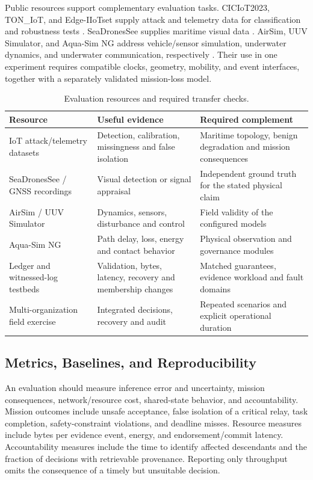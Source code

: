 Public resources support complementary evaluation tasks. CICIoT2023, TON\_IoT, and Edge-IIoTset supply attack and telemetry data for classification and robustness tests \citep{neto2023ciciot2023,alsaedi2020ton,ferrag2022edge}. SeaDronesSee supplies maritime visual data \citep{varga2022seadronessee}. AirSim, UUV Simulator, and Aqua-Sim NG address vehicle/sensor simulation, underwater dynamics, and underwater communication, respectively \citep{shah2018airsim,manhaes2016uuv,martin2017aqua}. Their use in one experiment requires compatible clocks, geometry, mobility, and event interfaces, together with a separately validated mission-loss model.

\begin{table}[!htb]
\caption{Evaluation resources and required transfer checks.\label{tab:evaluation}}
\begin{tabularx}{\textwidth}{@{}P{37mm}YY@{}}
\toprule
\textbf{Resource} & \textbf{Useful evidence} & \textbf{Required complement}\\
\midrule
IoT attack/telemetry datasets & Detection, calibration, missingness and false isolation & Maritime topology, benign degradation and mission consequences\\
SeaDronesSee / GNSS recordings & Visual detection or signal appraisal & Independent ground truth for the stated physical claim\\
AirSim / UUV Simulator & Dynamics, sensors, disturbance and control & Field validity of the configured models\\
Aqua-Sim NG & Path delay, loss, energy and contact behavior & Physical observation and governance modules\\
Ledger and witnessed-log testbeds & Validation, bytes, latency, recovery and membership changes & Matched guarantees, evidence workload and fault domains\\
Multi-organization field exercise & Integrated decisions, recovery and audit & Repeated scenarios and explicit operational duration\\
\bottomrule
\end{tabularx}
\end{table}

\subsection{Metrics, Baselines, and Reproducibility}

An evaluation should measure inference error and uncertainty, mission consequences, network/resource cost, shared-state behavior, and accountability. Mission outcomes include unsafe acceptance, false isolation of a critical relay, task completion, safety-constraint violations, and deadline misses. Resource measures include bytes per evidence event, energy, and endorsement/commit latency. Accountability measures include the time to identify affected descendants and the fraction of decisions with retrievable provenance. Reporting only throughput omits the consequence of a timely but unsuitable decision.

